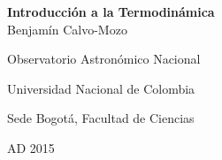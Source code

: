 \documentclass[11pt,fleqn,spanish]{book} %
\begin{document}

\begingroup
\thispagestyle{empty}
\centering
\vspace*{3.8cm}
\par\normalfont\fontsize{35}{35}\sffamily\selectfont
\textbf{Introducción a la Termodinámica}\\
\vspace*{0.5cm}
{\Huge Benjamín Calvo-Mozo}\par %
{\LARGE Observatorio Astronómico Nacional}\par
{\LARGE Universidad Nacional de Colombia}\par
{\LARGE Sede Bogotá, Facultad de Ciencias}\par
{\LARGE AD 2015}\par %
\endgroup


\newpage
~\vfill
\thispagestyle{empty}







\end{document}
